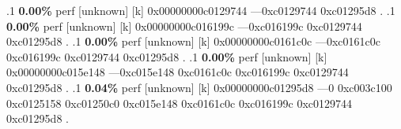 \begin{profile}
{.1 \textbf{ 0.00\%} perf             [unknown]              [k] 0x00000000c0129744\newline {} ---0xc0129744\newline {} 0xc01295d8\newline {} . 
.1 \textbf{ 0.00\%} perf             [unknown]              [k] 0x00000000c016199c\newline {} ---0xc016199c\newline {} 0xc0129744\newline {} 0xc01295d8\newline {} . 
.1 \textbf{ 0.00\%} perf             [unknown]              [k] 0x00000000c0161c0c\newline {} ---0xc0161c0c\newline {} 0xc016199c\newline {} 0xc0129744\newline {} 0xc01295d8\newline {} . 
.1 \textbf{ 0.00\%} perf             [unknown]              [k] 0x00000000c015e148\newline {} ---0xc015e148\newline {} 0xc0161c0c\newline {} 0xc016199c\newline {} 0xc0129744\newline {} 0xc01295d8\newline {} . 
.1 \textbf{ 0.04\%} perf             [unknown]              [k] 0x00000000c01295d8\newline {} ---0\newline {} 0xc003c100\newline {} 0xc0125158\newline {} 0xc01250c0\newline {} 0xc015e148\newline {} 0xc0161c0c\newline {} 0xc016199c\newline {} 0xc0129744\newline {} 0xc01295d8\newline {} . 
}
\end{profile}
